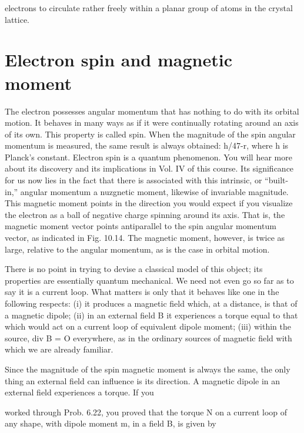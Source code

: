 {electrons to circulate rather freely within a planar group of atoms
in the crystal lattice.

\section{Electron spin and magnetic moment}

The electron possesses angular momentum that has nothing to
do with its orbital motion. It behaves in many ways as if it were
continually rotating around an axis of its own. This property is
called spin. When the magnitude of the spin angular momentum
is measured, the same result is always obtained: h/47-r, where h is
Planck's constant. Electron spin is a quantum phenomenon. You
will hear more about its discovery and its implications in Vol. IV of
this course. Its significance for us now lies in the fact that there is
associated with this intrinsic, or ``built-in,'' angular momentum a
nuzgnetic moment, likewise of invariable magnitude. This magnetic
moment points in the direction you would expect if you visualize
the electron as a ball of negative charge spinning around its axis.
That is, the magnetic moment vector points antiparallel to the spin
angular momentum vector, as indicated in Fig. 10.14. The magnetic
moment, however, is twice as large, relative to the angular 
momentum, as is the case in orbital motion.

There is no point in trying to devise a classical model of this object;
its properties are essentially quantum mechanical. We need not
even go so far as to say it is a current loop. What matters is only that
it behaves like one in the following respects: (i) it produces a magnetic
field which, at a distance, is that of a magnetic dipole; (ii) in an
external field B it experiences a torque equal to that which would
act on a current loop of equivalent dipole moment; (iii) within the
source, div B = O everywhere, as in the ordinary sources of magnetic
field with which we are already familiar.

Since the magnitude of the spin magnetic moment is always the
same, the only thing an external field can influence is its direction.
A magnetic dipole in an external field experiences a torque. If you

 

 

worked through Prob. 6.22, you proved that the torque N on a current
loop of any shape, with dipole moment m, in a field B, is given by

}

